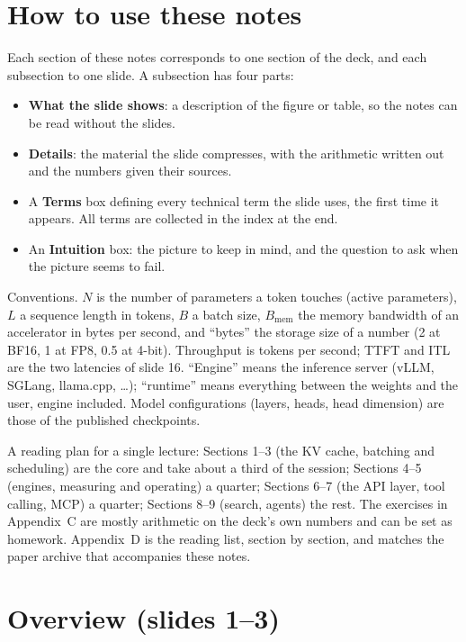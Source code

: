 \documentclass[11pt,letterpaper]{article}
\newcommand{\setstage}[1]{\colorlet{stagec}{#1}}
\newcommand{\bw}{B_{\mathrm{mem}}}
\begin{document}
\section*{How to use these notes}
Each section of these notes corresponds to one section of the deck, and each subsection to one slide. A subsection has four parts:
\begin{itemize}
  \item \textbf{What the slide shows}: a description of the figure or table, so the notes can be read without the slides.
  \item \textbf{Details}: the material the slide compresses, with the arithmetic written out and the numbers given their sources.
  \item A \textbf{Terms} box defining every technical term the slide uses, the first time it appears. All terms are collected in the index at the end.
  \item An \textbf{Intuition} box: the picture to keep in mind, and the question to ask when the picture seems to fail.
\end{itemize}
Conventions. $N$ is the number of parameters a token touches (active parameters), $L$ a sequence length in tokens, $B$ a batch size, $\bw$ the memory bandwidth of an accelerator in bytes per second, and ``bytes'' the storage size of a number (2 at BF16, 1 at FP8, 0.5 at 4-bit). Throughput is tokens per second; TTFT and ITL are the two latencies of slide 16. ``Engine'' means the inference server (vLLM, SGLang, llama.cpp, \ldots); ``runtime'' means everything between the weights and the user, engine included. Model configurations (layers, heads, head dimension) are those of the published checkpoints.

A reading plan for a single lecture: Sections 1--3 (the KV cache, batching and scheduling) are the core and take about a third of the session; Sections 4--5 (engines, measuring and operating) a quarter; Sections 6--7 (the API layer, tool calling, MCP) a quarter; Sections 8--9 (search, agents) the rest. The exercises in Appendix~C are mostly arithmetic on the deck's own numbers and can be set as homework. Appendix~D is the reading list, section by section, and matches the paper archive that accompanies these notes.

\setstage{ink}
\section{Overview (slides 1--3)}
\end{document}
